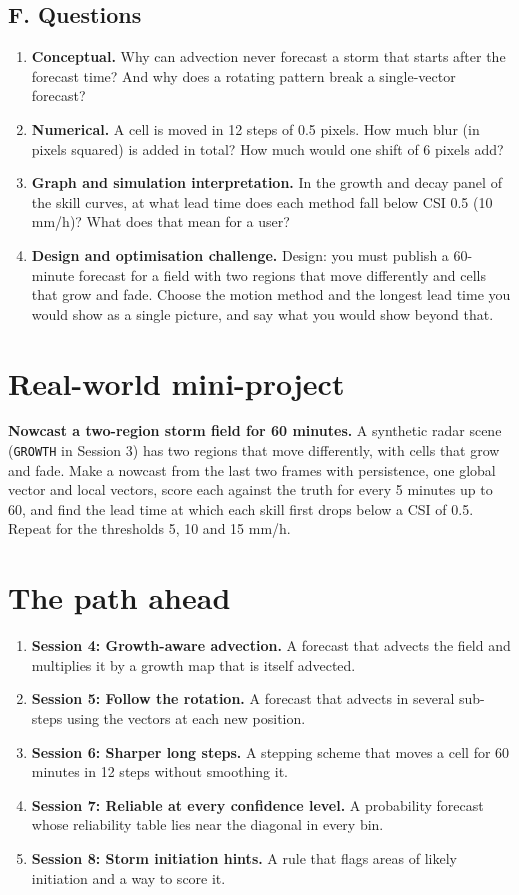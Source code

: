 \documentclass[11pt,a4paper]{article}
\begin{document}
\subsection*{F. Questions}
\begin{enumerate}[nosep]
\item \textbf{Conceptual.} Why can advection never forecast a storm that starts after the forecast time? And why does a rotating pattern break a single-vector forecast?
\item \textbf{Numerical.} A cell is moved in 12 steps of 0.5 pixels. How much blur (in pixels squared) is added in total? How much would one shift of 6 pixels add?
\item \textbf{Graph and simulation interpretation.} In the growth and decay panel of the skill curves, at what lead time does each method fall below CSI 0.5 (10 mm/h)? What does that mean for a user?
\item \textbf{Design and optimisation challenge.} Design: you must publish a 60-minute forecast for a field with two regions that move differently and cells that grow and fade. Choose the motion method and the longest lead time you would show as a single picture, and say what you would show beyond that.
\end{enumerate}

\section{Real-world mini-project}
\textbf{Nowcast a two-region storm field for 60 minutes.} A synthetic radar scene (\texttt{GROWTH} in Session 3) has two regions that move differently, with cells that grow and fade. Make a nowcast from the last two frames with persistence, one global vector and local vectors, score each against the truth for every 5 minutes up to 60, and find the lead time at which each skill first drops below a CSI of 0.5. Repeat for the thresholds 5, 10 and 15 mm/h.

\section{The path ahead}
\begin{enumerate}[nosep]
\item \textbf{Session 4: Growth-aware advection.} A forecast that advects the field and multiplies it by a growth map that is itself advected.
\item \textbf{Session 5: Follow the rotation.} A forecast that advects in several sub-steps using the vectors at each new position.
\item \textbf{Session 6: Sharper long steps.} A stepping scheme that moves a cell for 60 minutes in 12 steps without smoothing it.
\item \textbf{Session 7: Reliable at every confidence level.} A probability forecast whose reliability table lies near the diagonal in every bin.
\item \textbf{Session 8: Storm initiation hints.} A rule that flags areas of likely initiation and a way to score it.
\end{enumerate}
\end{document}
